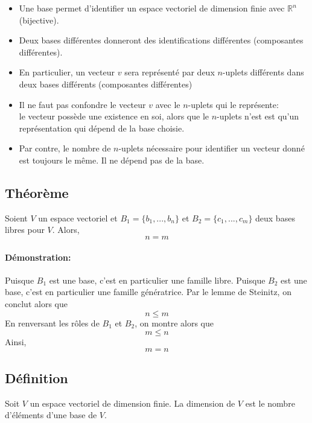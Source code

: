 \documentclass[
    11pt,
    a4paper,
    oneside,
    headinlcude, footinclude,
    twoside,
]{report}
\begin{document}
\begin{itemize}
    \item Une base permet d'identifier un espace vectoriel de dimension finie
        avec $\mathbb{R}^{n}$ (bijective).

    \item Deux bases différentes donneront des identifications différentes
        (composantes différentes).

    \item En particulier, un vecteur $v$ sera représenté par deux $n$-uplets
        différents dans deux bases différents (composantes différentes)

    \item Il ne faut pas confondre le vecteur $v$ avec le $n$-uplets qui le
        représente: \\le vecteur possède une existence en soi, alors que le $n$-uplets
        n'est est qu'un représentation qui dépend de la base choisie.

    \item Par contre, le nombre de $n$-uplets nécessaire pour identifier un
        vecteur donné est toujours le même. Il ne dépend pas de la base.
\end{itemize}

\subsection{Théorème}
\label{sub:theoreme}

Soient $V$ un espace vectoriel et $B_{1} = \{b_{1}, ..., b_{n}\}$ et
$B_{2} = \{c_{1}, ..., c_{m}\}$ deux bases libres pour $V$. Alors,
$$n = m$$

\paragraph{Démonstration:}

Puisque $B_{1}$ est une base, c'est en particulier une famille libre. Puisque
$B_{2}$ est une base, c'est en particulier une famille génératrice. Par le
lemme de Steinitz, on conclut alors que $$n \leq m$$
En renversant les rôles de $B_{1}$ et $B_{2}$, on montre alors que $$m \leq n$$
Ainsi, $$m = n$$

\subsection{Définition}
\label{sub:definition}

Soit $V$ un espace vectoriel de dimension finie. La dimension de $V$ est le
nombre d'éléments d'une base de $V$.
\end{document}
